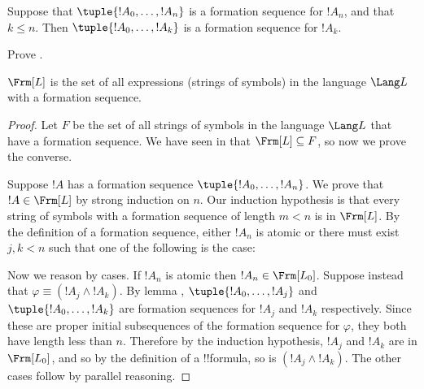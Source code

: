\documentclass[../../../include/open-logic-section]{subfiles}
\begin{document}
\begin{lem}
Suppose that $\tuple{!A_0,\dotsc,!A_n}$ is a formation sequence
for $!A_n$, and that $k \leq n$. Then $\tuple{!A_0,\dotsc,!A_k}$
is a formation sequence for $!A_k$.
\end{lem}

\begin{prob}
Prove .
\end{prob}

\begin{thm}
$\Frm[L]$ is the set of all expressions (strings of symbols)
in the language $\Lang L$ with a formation sequence.
\end{thm}

\begin{proof}
Let $F$ be the set of all strings of symbols in the language
$\Lang L$ that have a formation sequence. We have seen in
 that $\Frm[L] \subseteq F$,
so now we prove the converse.

Suppose $!A$ has a formation sequence $\tuple{!A_0,\dotsc,!A_n}$.
We prove that $!A \in \Frm[L]$ by strong induction on $n$.
Our induction hypothesis is that every string of symbols with a
formation sequence of length $m < n$ is in $\Frm[L]$.
By the definition of a formation sequence, either $!A_n$ is
atomic or there must exist $j,k < n$ such that one of the
following is the case:
\begin{enumerate}
\end{enumerate}
Now we reason by cases. If $!A_n$ is atomic then
$!A_n \in \Frm[L_0]$. Suppose instead that $\varphi \equiv
(!A_j \land !A_k)$. By lemma ,
$\tuple{!A_0,\dotsc,!A_j}$ and $\tuple{!A_0,\dotsc,!A_k}$ are
formation sequences for $!A_j$ and $!A_k$ respectively. Since
these are proper initial subsequences of the formation sequence
for $\varphi$, they both have length less than $n$. Therefore by
the induction hypothesis, $!A_j$ and $!A_k$ are in $\Frm[L_0]$,
and so by the definition of a !!{formula}, so is
$(!A_j \land !A_k)$. The other cases follow by parallel
reasoning.
\end{proof}
\end{document}
